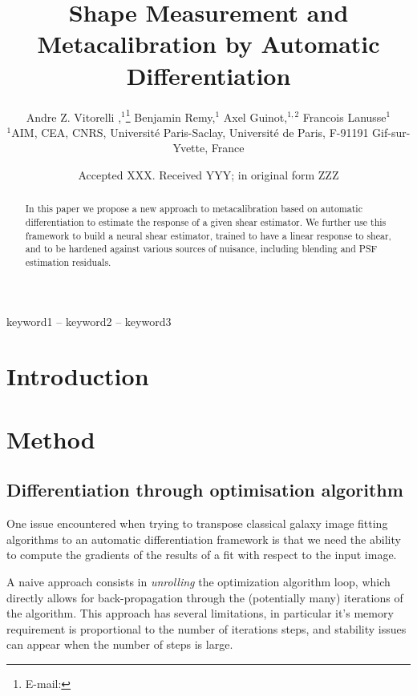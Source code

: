 \documentclass[fleqn,usenatbib]{mnras}
\title[AutoMetaCal]{Shape Measurement and Metacalibration by Automatic Differentiation}
\author[Vitorelli et al.]{
Andre Z. Vitorelli ,$^{1}$\thanks{E-mail: }
Benjamin Remy,$^{1}$
Axel Guinot,$^{1,2}$
Francois Lanusse$^{1}$
\\
$^{1}$AIM, CEA, CNRS, Université Paris-Saclay, Université de Paris, F-91191 Gif-sur-Yvette, France
}
\date{Accepted XXX. Received YYY; in original form ZZZ}
\begin{document}
\label{firstpage}
\pagerange{\pageref{firstpage}--\pageref{lastpage}}
\maketitle

\begin{abstract}
In this paper we propose a new approach to metacalibration based on automatic differentiation
to estimate the response of a given shear estimator. We further use this framework to
build a neural shear estimator, trained to have a linear response to shear, and to be 
hardened against various sources of nuisance, including blending and PSF estimation residuals.
\end{abstract}

\begin{keywords}
keyword1 -- keyword2 -- keyword3
\end{keywords}



\section{Introduction}

\section{Method}

\subsection{Differentiation through optimisation algorithm}

One issue encountered when trying to transpose classical galaxy image fitting algorithms to an automatic differentiation framework is that we need the ability to compute the gradients of the results of a fit with respect to the input image. 

A naive approach consists in \textit{unrolling} the optimization algorithm loop, which directly allows for back-propagation through the (potentially many) iterations of the algorithm. This approach has several limitations, in particular it's memory requirement is proportional to the number of iterations steps, and stability issues can appear when the number of steps is large.
\end{document}
